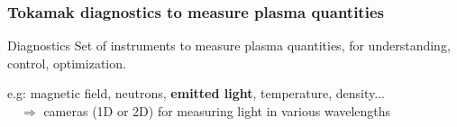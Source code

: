 \documentclass[10pt]{beamer}
\begin{document}
\begin{frame}
\frametitle{Tokamak diagnostics to measure plasma quantities}

\begin{alertblock}{Diagnostics}
Set of instruments to measure plasma quantities, for understanding, control, optimization.
\end{alertblock}

e.g: magnetic field, neutrons, \textbf{emitted light}, temperature, density...\\[1cm]


$\quad \Rightarrow$ cameras (1D or 2D) for measuring light in various wavelengths


%
%
%
%
%



\end{frame}


%
%
%
%
%
%
\end{document}
